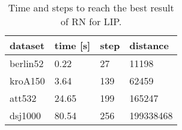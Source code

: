 \begin{table}[!htb]
	\centering
	\begin{tabular}{|l|l|l|l|}
		\hline
		dataset  & time {[}s{]} & step & distance  \\ \hline
		berlin52 & 0.22         & 27   & 11198     \\ \hline
		kroA150  & 3.64         & 139  & 62459     \\ \hline
		att532   & 24.65        & 199  & 165247    \\ \hline
		dsj1000  & 80.54        & 256  & 199338468 \\ \hline
	\end{tabular}
	\caption{Time and steps to reach the best result of RN for LIP.}
	\label{tab:time_to_reach}
\end{table}